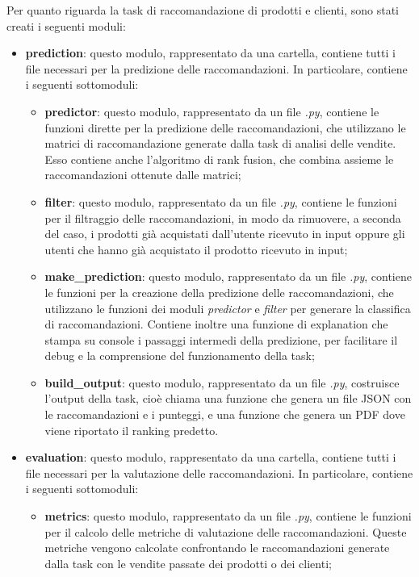 Per quanto riguarda la task di raccomandazione di prodotti e clienti, sono stati creati i seguenti moduli:
\begin{itemize}
    \item \textbf{prediction}: questo modulo, rappresentato da una cartella, contiene tutti i file necessari per la predizione delle raccomandazioni. In particolare, contiene i seguenti sottomoduli:
    \begin{itemize}
        \item \textbf{predictor}: questo modulo, rappresentato da un file \emph{.py}, contiene le funzioni dirette per la predizione delle raccomandazioni, che utilizzano le matrici di raccomandazione generate dalla task di analisi delle vendite. Esso contiene anche l'algoritmo di rank fusion, che combina assieme le raccomandazioni ottenute dalle matrici;
        \item \textbf{filter}: questo modulo, rappresentato da un file \emph{.py}, contiene le funzioni per il filtraggio delle raccomandazioni, in modo da rimuovere, a seconda del caso, i prodotti già acquistati dall'utente ricevuto in input oppure gli utenti che hanno già acquistato il prodotto ricevuto in input;
        \item \textbf{make\_prediction}: questo modulo, rappresentato da un file \emph{.py}, contiene le funzioni per la creazione della predizione delle raccomandazioni, che utilizzano le funzioni dei moduli \emph{predictor} e \emph{filter} per generare la classifica di raccomandazioni. Contiene inoltre una funzione di explanation che stampa su console i passaggi intermedi della predizione, per facilitare il debug e la comprensione del funzionamento della task;
        \item \textbf{build\_output}: questo modulo, rappresentato da un file \emph{.py}, costruisce l'output della task, cioè chiama una funzione che genera un file JSON con le raccomandazioni e i punteggi, e una funzione che genera un PDF dove viene riportato il ranking predetto.
    \end{itemize}
    \item \textbf{evaluation}: questo modulo, rappresentato da una cartella, contiene tutti i file necessari per la valutazione delle raccomandazioni. In particolare, contiene i seguenti sottomoduli:
    \begin{itemize}
        \item \textbf{metrics}: questo modulo, rappresentato da un file \emph{.py}, contiene le funzioni per il calcolo delle metriche di valutazione delle raccomandazioni. Queste metriche vengono calcolate confrontando le raccomandazioni generate dalla task con le vendite passate dei prodotti o dei clienti;

\end{itemize}
\end{itemize}
